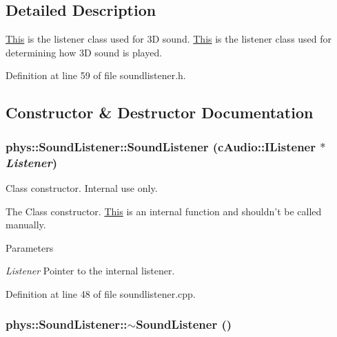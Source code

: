 \subsection{Detailed Description}
\hyperlink{structThis}{This} is the listener class used for 3D sound. \hyperlink{structThis}{This} is the listener class used for determining how 3D sound is played. 

Definition at line 59 of file soundlistener.h.



\subsection{Constructor \& Destructor Documentation}
\hypertarget{classphys_1_1SoundListener_ab4063bdd8b0bc654a416915354ed0312}{
\subsubsection[{SoundListener}]{\setlength{\rightskip}{0pt plus 5cm}phys::SoundListener::SoundListener (cAudio::IListener $\ast$ {\em Listener})}}
\label{d1/d5a/classphys_1_1SoundListener_ab4063bdd8b0bc654a416915354ed0312}


Class constructor. Internal use only. 

The Class constructor. \hyperlink{structThis}{This} is an internal function and shouldn't be called manually. 
\begin{DoxyParams}{Parameters}
\item[{\em Listener}]Pointer to the internal listener. \end{DoxyParams}


Definition at line 48 of file soundlistener.cpp.

\hypertarget{classphys_1_1SoundListener_ab32dd020228ca0e09271f988d3a2e7f9}{
\subsubsection[{$\sim$SoundListener}]{\setlength{\rightskip}{0pt plus 5cm}phys::SoundListener::$\sim$SoundListener ()}}
\label{d1/d5a/classphys_1_1SoundListener_ab32dd020228ca0e09271f988d3a2e7f9}


